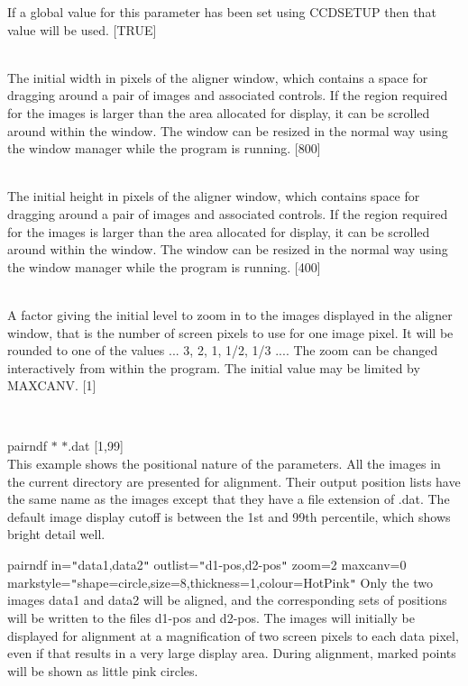 \documentclass[twoside,11pt]{article}
\newcommand{\htmlref}[2]{#1}
\renewcommand{\_}{\texttt{\symbol{95}}}
\newcommand{\xroutine}[1]{\htmlref{{\sc #1}}{#1}}
\newcommand{\sstexamples}[1]{
   \item[Examples:] \mbox{} \\
   \vspace{-3.5ex}
   \begin{description}
      #1
   \end{description}
}
\newcommand{\sstsubsection}[1]{ \item[{#1}] \mbox{} \\}
\newcommand{\sstexamplesubsection}[2]{\sloppy \item{\ssttt #1} \mbox{} \\ #2 }
\newcommand{\sstnotes}[1]{\item[Notes:] \mbox{} \\[1.3ex] #1}
\newcommand{\sstitemlist}[1]{
  \mbox{} \\
  \vspace{-3.5ex}
  \begin{itemize}
     #1
  \end{itemize}
}
\newcommand{\sstexamples}[1]{
      \item[Examples:] \\
      \begin{description}
         #1
      \end{description}
      \\
   }
\newcommand{\sstsubsection}[1]{\item[{#1}]}
\newcommand{\sstexamplesubsection}[2]{\item[{\ssttt #1}] #2}
\newcommand{\sstnotes}[1]{\item[Notes:] #1 }
\newcommand{\sstitemlist}[1]{
      \begin{itemize}
         #1
      \end{itemize}
      \\
   }
\begin{document}
{{{         If a global value for this parameter has been set using
         \xroutine{CCDSETUP} then that value will be used.
         [TRUE]
      }
      \sstsubsection{
         WINX = \_INTEGER (Read and Write)
      }{
         The initial width in pixels of the aligner window, which contains
         a space for dragging around a pair of images and associated
         controls.  If the region required for the images is larger
         than the area allocated for display, it can be scrolled
         around within the window.  The window can be resized in the
         normal way using the window manager while the program is running.
         [800]
      }
      \sstsubsection{
         WINY = \_INTEGER (Read and Write)
      }{
         The initial height in pixels of the aligner window, which contains
         space for dragging around a pair of images and associated
         controls.  If the region required for the images is larger
         than the area allocated for display, it can be scrolled
         around within the window.  The window can be resized in the
         normal way using the window manager while the program is running.
         [400]
      }
      \sstsubsection{
         ZOOM = \_DOUBLE (Read and Write)
      }{
         A factor giving the initial level to zoom in to the images
         displayed in the aligner window, that is the number of screen
         pixels to use for one image pixel.  It will be rounded to one
         of the values ... 3, 2, 1, 1/2, 1/3 ....  The zoom can be
         changed interactively from within the program.  The initial
         value may be limited by MAXCANV.
         [1]
      }
   }
   \sstexamples{
      \sstexamplesubsection{
         pairndf $*$ $*$.dat [1,99]
      }{
         This example shows the positional nature of the parameters.
         All the images in the current directory are presented for
         alignment.  Their output position lists have the same name
         as the images except that they have a file extension of .dat.
         The default image display cutoff is between the 1st and 99th
         percentile, which shows bright detail well.
      }
      \sstexamplesubsection{
         pairndf in={\tt "}data1,data2{\tt "} outlist={\tt "}d1-pos,d2-pos{\tt "} zoom=2 maxcanv=0
      }{
              markstyle={\tt "}shape=circle,size=8,thickness=1,colour=HotPink{\tt "}
         Only the two images data1 and data2 will be aligned, and the
         corresponding sets of positions will be written to the
         files d1-pos and d2-pos.  The images will initially be
         displayed for alignment at a magnification of two screen
         pixels to each data pixel, even if that results in a very
         large display area.  During alignment, marked points will be
         shown as little pink circles.
      }
   }
   \sstnotes{
      \sstitemlist{

}}}
\end{document}
